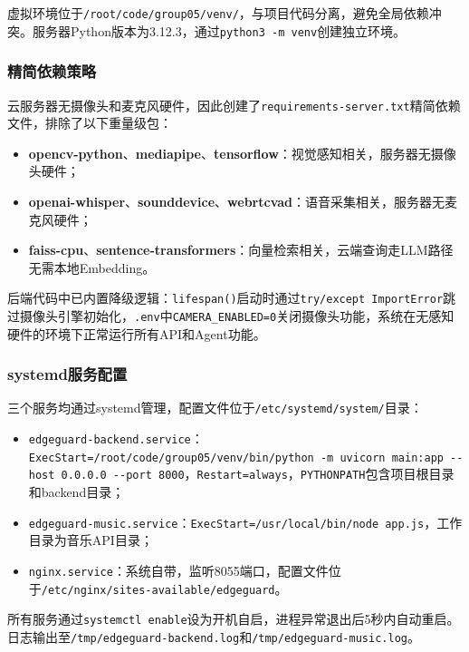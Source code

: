 \documentclass[a4paper]{article}
\begin{document}
虚拟环境位于\texttt{/root/code/group05/venv/}，与项目代码分离，避免全局依赖冲突。服务器Python版本为3.12.3，通过\texttt{python3 -m venv}创建独立环境。

\subsubsection{精简依赖策略}

云服务器无摄像头和麦克风硬件，因此创建了\texttt{requirements-server.txt}精简依赖文件，排除了以下重量级包：

\begin{itemize}
    \item \textbf{opencv-python}、\textbf{mediapipe}、\textbf{tensorflow}：视觉感知相关，服务器无摄像头硬件；
    \item \textbf{openai-whisper}、\textbf{sounddevice}、\textbf{webrtcvad}：语音采集相关，服务器无麦克风硬件；
    \item \textbf{faiss-cpu}、\textbf{sentence-transformers}：向量检索相关，云端查询走LLM路径无需本地Embedding。
\end{itemize}

后端代码中已内置降级逻辑：\texttt{lifespan()}启动时通过\texttt{try/except ImportError}跳过摄像头引擎初始化，\texttt{.env}中\texttt{CAMERA\_ENABLED=0}关闭摄像头功能，系统在无感知硬件的环境下正常运行所有API和Agent功能。

\subsubsection{systemd服务配置}

三个服务均通过systemd管理，配置文件位于\texttt{/etc/systemd/system/}目录：

\begin{itemize}
    \item \texttt{edgeguard-backend.service}：\texttt{ExecStart=/root/code/group05/venv/bin/python -m uvicorn main:app -{}-host 0.0.0.0 -{}-port 8000}，\texttt{Restart=always}，\texttt{PYTHONPATH}包含项目根目录和backend目录；
    \item \texttt{edgeguard-music.service}：\texttt{ExecStart=/usr/local/bin/node app.js}，工作目录为音乐API目录；
    \item \texttt{nginx.service}：系统自带，监听8055端口，配置文件位于\texttt{/etc/nginx/sites-available/edgeguard}。
\end{itemize}

所有服务通过\texttt{systemctl enable}设为开机自启，进程异常退出后5秒内自动重启。日志输出至\texttt{/tmp/edgeguard-backend.log}和\texttt{/tmp/edgeguard-music.log}。
\end{document}
